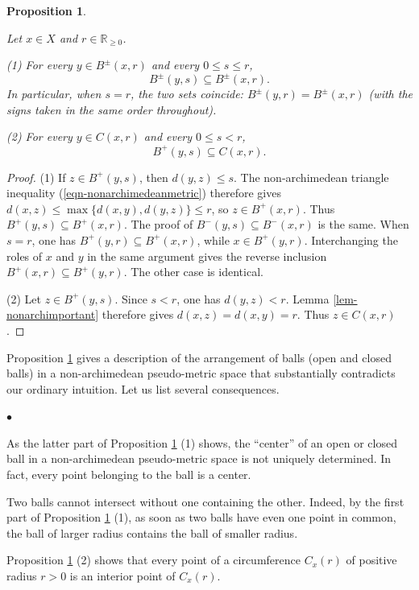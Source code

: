 \documentclass[a4paper,12pt, dvipdfmx]{jsbook}
\def\R{\mathbb{R}}
\renewenvironment{itemize}%
{%
   \begin{list}{\parbox{1zw}{$\bullet$}}%
   {%
      \setlength{\topsep}{.5zh}
      \setlength{\itemindent}{0zw}
      \setlength{\leftmargin}{3zw}%
      \setlength{\rightmargin}{0zw}%
      \setlength{\labelsep}{.5zw}%
      \setlength{\labelwidth}{3zw}%
      \setlength{\itemsep}{0.2em}%
      \setlength{\parsep}{0em}%
      \setlength{\listparindent}{0zw}%
   }
}{%
   \end{list}%
}
\theoremstyle{plain}
\newtheorem{prop}[thm]{\bfseries Proposition}
\theoremstyle{definition}
\begin{document}
\begin{prop}\label{prop-nonarchimportant1}{\rm
Let $x\in X$ and $r\in\R_{\geq 0}$.

(1) For every $y\in B^{\pm}(x,r)$ and every $0\leq s\leq r$,
$$
B^{\pm}(y,s)\subseteq B^{\pm}(x,r).
$$
In particular, when $s=r$, the two sets coincide: $B^{\pm}(y,r)=B^{\pm}(x,r)$ (with the signs taken in the same order throughout).

(2) For every $y\in C(x,r)$ and every $0\leq s<r$,
$$
B^+(y,s)\subseteq C(x,r).
$$}
\end{prop}

\begin{proof}[Proof]
(1) If $z\in B^+(y,s)$, then $d(y,z)\leq s$. The non-archimedean triangle inequality (\ref{eqn-nonarchimedeanmetric}) therefore gives $d(x,z)\leq\max\{d(x,y),d(y,z)\}\leq r$, so $z\in B^+(x,r)$. Thus $B^+(y,s)\subseteq B^+(x,r)$.
The proof of $B^-(y,s)\subseteq B^-(x,r)$ is the same.
When $s=r$, one has $B^+(y,r)\subseteq B^+(x,r)$, while $x\in B^+(y,r)$. Interchanging the roles of $x$ and $y$ in the same argument gives the reverse inclusion $B^+(x,r)\subseteq B^+(y,r)$. The other case is identical.

(2) Let $z\in B^+(y,s)$. Since $s<r$, one has $d(y,z)<r$.
Lemma \ref{lem-nonarchimportant} therefore gives $d(x,z)=d(x,y)=r$.
Thus $z\in C(x,r)$.
\end{proof}

Proposition \ref{prop-nonarchimportant1} gives a description of the arrangement of balls (open and closed balls) in a non-archimedean pseudo-metric space that substantially contradicts our ordinary intuition. Let us list several consequences.
\begin{itemize}
\item As the latter part of Proposition \ref{prop-nonarchimportant1} (1) shows, the ``center'' of an open or closed ball in a non-archimedean pseudo-metric space is not uniquely determined. In fact, every point belonging to the ball is a center.
\item Two balls cannot intersect without one containing the other. Indeed, by the first part of Proposition \ref{prop-nonarchimportant1} (1), as soon as two balls have even one point in common, the ball of larger radius contains the ball of smaller radius.
\item Proposition \ref{prop-nonarchimportant1} (2) shows that every point of a circumference $C_x(r)$ of positive radius $r>0$ is an interior point of $C_x(r)$.
\end{itemize}
\end{document}
